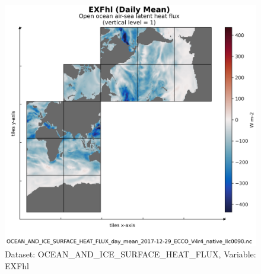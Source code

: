 \begin{figure}[H]
\centering
\includegraphics[scale=0.55]{../images/plots/v4r4/native_plots/Ocean_and_Sea-Ice_Surface_Heat_Fluxes/EXFhl.png}
\caption{Dataset: OCEAN\_AND\_ICE\_SURFACE\_HEAT\_FLUX, Variable: EXFhl}
\label{tab:table-OCEAN_AND_ICE_SURFACE_HEAT_FLUX_EXFhl-Plot}
\end{figure}
\newpage
\pagebreak
